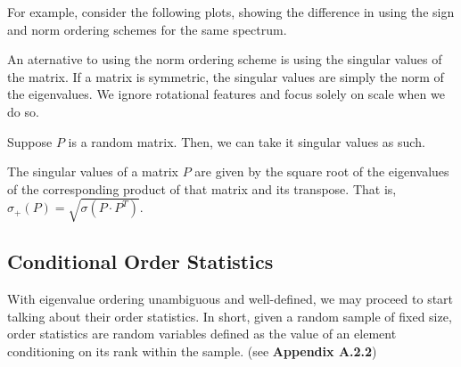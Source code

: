 For example, consider the following plots, showing the difference in using the sign and norm ordering schemes for the same spectrum.


{}

An aternative to using the norm ordering scheme is using the singular values of the matrix.
If a matrix is symmetric, the singular values are simply the norm of the eigenvalues.
We ignore rotational features and focus solely on scale when we do so.

Suppose $P$ is a random matrix. Then, we can take it singular values as such.

\begin{definition}
The singular values of a matrix $P$ are given by the square root of the eigenvalues of the corresponding product of that matrix and its transpose. That is, $\sigma_+(P) = \sqrt{\sigma(P \cdot P^T)}$.
\end{definition}


\spectrumschemetable

\newpage
\subsection{Conditional Order Statistics}


With eigenvalue ordering unambiguous and well-defined, we may proceed to start talking about their order statistics.
In short, given a random sample of fixed size, order statistics are random variables defined as the value of an element conditioning on its rank within the sample. (see \textbf{Appendix A.2.2})


